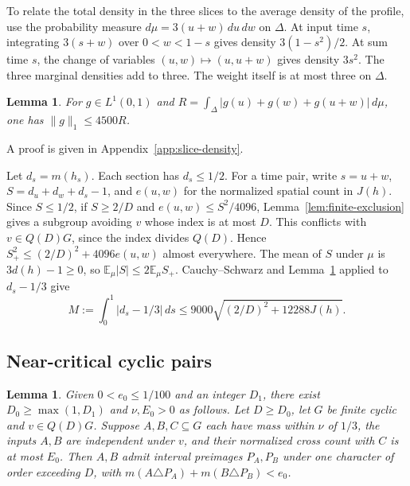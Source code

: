 \documentclass[11pt,reqno]{amsart}
\newtheorem{lemma}[theorem]{Lemma}
\newcommand{\E}{\mathbb E}
\numberwithin{equation}{section}
\begin{document}
To relate the total density in the three slices to the average
density of the profile, use the probability measure
\(d\mu=3(u+w)\,du\,dw\) on \(\Delta\).
At input time \(s\), integrating \(3(s+w)\) over \(0<w<1-s\)
gives density \(3(1-s^2)/2\). At sum time \(s\), the change of
variables \((u,w)\mapsto(u,u+w)\) gives density \(3s^2\).
The three marginal densities add to three. The weight itself
is at most three on \(\Delta\).

\begin{lemma}\label{lem:triangle}
For \(g\in L^1(0,1)\) and \(R=\int_\Delta|g(u)+g(w)+g(u+w)|\,d\mu\),
one has \(\|g\|_1\le4500 R\).
\end{lemma}

A proof is given in Appendix~\ref{app:slice-density}.

Let \(d_s=m(h_s)\). Each section has \(d_s\le1/2\). For a time pair,
write \(s=u+w\), \(S=d_u+d_w+d_s-1\), and \(e(u,w)\) for the normalized
spatial count in \(J(h)\). Since \(S\le1/2\), if \(S\ge2/D\)
and \(e(u,w)\le S^2/4096\),
Lemma~\ref{lem:finite-exclusion} gives a subgroup avoiding \(v\)
whose index is at most \(D\). This conflicts with \(v\in Q(D)G\),
since the index divides \(Q(D)\). Hence \(S_+^2\le (2/D)^2+4096e(u,w)\)
almost everywhere. The mean of \(S\) under \(\mu\) is
\(3d(h)-1\ge0\), so \(\E_\mu|S|\le2\E_\mu S_+\). Cauchy--Schwarz
and Lemma~\ref{lem:triangle} applied to \(d_s-1/3\) give
\begin{equation}\label{eq:flat}
 M:=\int_0^1 |d_s-1/3|\,ds
 \le9000\sqrt{(2/D)^2+12288J(h)}.
\end{equation}

\subsection{Near-critical cyclic pairs}\label{sec:critical-pairs}

\begin{lemma}\label{lem:pairs}
Given \(0<e_0\le1/100\) and an integer \(D_1\), there exist
\(D_0\ge\max(1,D_1)\) and \(\nu,E_0>0\) as follows.
Let \(D\ge D_0\), let \(G\) be finite cyclic and \(v\in Q(D)G\).
Suppose \(A,B,C\subseteq G\) each have mass within \(\nu\) of
\(1/3\), the inputs \(A,B\) are independent under \(v\), and their
normalized cross count with \(C\) is at most \(E_0\).
Then \(A,B\) admit interval preimages \(P_A,P_B\) under one
character of order exceeding \(D\), with
\(m(A\triangle P_A)+m(B\triangle P_B)<e_0\).
\end{lemma}
\end{document}
